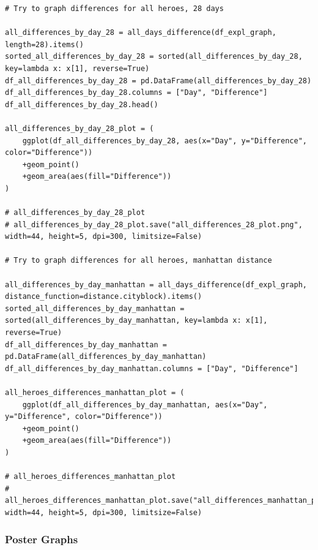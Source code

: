 \begin{verbatim}
# Try to graph differences for all heroes, 28 days

all_differences_by_day_28 = all_days_difference(df_expl_graph, length=28).items()
sorted_all_differences_by_day_28 = sorted(all_differences_by_day_28, key=lambda x: x[1], reverse=True)
df_all_differences_by_day_28 = pd.DataFrame(all_differences_by_day_28)
df_all_differences_by_day_28.columns = ["Day", "Difference"]
df_all_differences_by_day_28.head()

all_differences_by_day_28_plot = (
    ggplot(df_all_differences_by_day_28, aes(x="Day", y="Difference", color="Difference"))
    +geom_point()
    +geom_area(aes(fill="Difference"))
)

# all_differences_by_day_28_plot
# all_differences_by_day_28_plot.save("all_differences_28_plot.png", width=44, height=5, dpi=300, limitsize=False)

# Try to graph differences for all heroes, manhattan distance

all_differences_by_day_manhattan = all_days_difference(df_expl_graph, distance_function=distance.cityblock).items()
sorted_all_differences_by_day_manhattan = sorted(all_differences_by_day_manhattan, key=lambda x: x[1], reverse=True)
df_all_differences_by_day_manhattan = pd.DataFrame(all_differences_by_day_manhattan)
df_all_differences_by_day_manhattan.columns = ["Day", "Difference"]

all_heroes_differences_manhattan_plot = (
    ggplot(df_all_differences_by_day_manhattan, aes(x="Day", y="Difference", color="Difference"))
    +geom_point()
    +geom_area(aes(fill="Difference"))
)

# all_heroes_differences_manhattan_plot
# all_heroes_differences_manhattan_plot.save("all_differences_manhattan_plot.png", width=44, height=5, dpi=300, limitsize=False)
\end{verbatim}

\subsubsection*{Poster Graphs}


